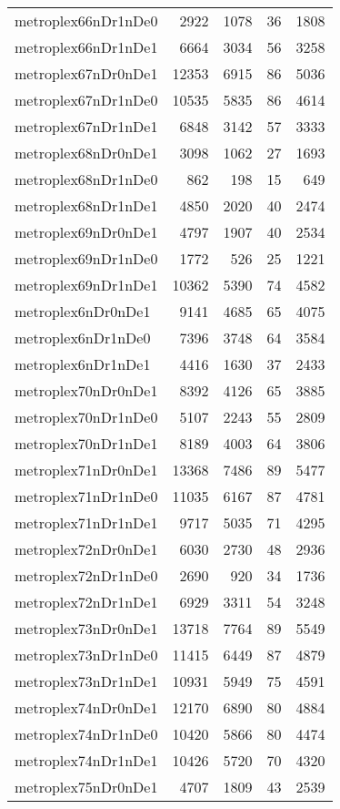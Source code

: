 \begin{longtable}{lrrrr}
metroplex66nDr1nDe0 & 2922 & 1078 & 36 & 1808 \\
metroplex66nDr1nDe1 & 6664 & 3034 & 56 & 3258 \\
metroplex67nDr0nDe1 & 12353 & 6915 & 86 & 5036 \\
metroplex67nDr1nDe0 & 10535 & 5835 & 86 & 4614 \\
metroplex67nDr1nDe1 & 6848 & 3142 & 57 & 3333 \\
metroplex68nDr0nDe1 & 3098 & 1062 & 27 & 1693 \\
metroplex68nDr1nDe0 & 862 & 198 & 15 & 649 \\
metroplex68nDr1nDe1 & 4850 & 2020 & 40 & 2474 \\
metroplex69nDr0nDe1 & 4797 & 1907 & 40 & 2534 \\
metroplex69nDr1nDe0 & 1772 & 526 & 25 & 1221 \\
metroplex69nDr1nDe1 & 10362 & 5390 & 74 & 4582 \\
metroplex6nDr0nDe1 & 9141 & 4685 & 65 & 4075 \\
metroplex6nDr1nDe0 & 7396 & 3748 & 64 & 3584 \\
metroplex6nDr1nDe1 & 4416 & 1630 & 37 & 2433 \\
metroplex70nDr0nDe1 & 8392 & 4126 & 65 & 3885 \\
metroplex70nDr1nDe0 & 5107 & 2243 & 55 & 2809 \\
metroplex70nDr1nDe1 & 8189 & 4003 & 64 & 3806 \\
metroplex71nDr0nDe1 & 13368 & 7486 & 89 & 5477 \\
metroplex71nDr1nDe0 & 11035 & 6167 & 87 & 4781 \\
metroplex71nDr1nDe1 & 9717 & 5035 & 71 & 4295 \\
metroplex72nDr0nDe1 & 6030 & 2730 & 48 & 2936 \\
metroplex72nDr1nDe0 & 2690 & 920 & 34 & 1736 \\
metroplex72nDr1nDe1 & 6929 & 3311 & 54 & 3248 \\
metroplex73nDr0nDe1 & 13718 & 7764 & 89 & 5549 \\
metroplex73nDr1nDe0 & 11415 & 6449 & 87 & 4879 \\
metroplex73nDr1nDe1 & 10931 & 5949 & 75 & 4591 \\
metroplex74nDr0nDe1 & 12170 & 6890 & 80 & 4884 \\
metroplex74nDr1nDe0 & 10420 & 5866 & 80 & 4474 \\
metroplex74nDr1nDe1 & 10426 & 5720 & 70 & 4320 \\
metroplex75nDr0nDe1 & 4707 & 1809 & 43 & 2539 \\

\end{longtable}
